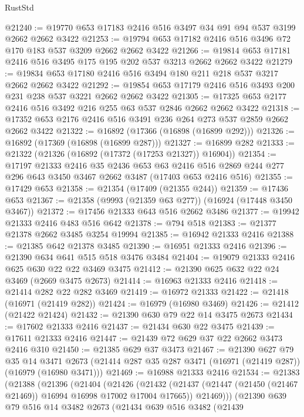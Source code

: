 \begin{lexlean}{RustStd}
\begin{coremodule}
@21240 := @19770 @653 @17183 @2416 @516 @3497 @34 @91 @94 @537 @3199 @2662 @2662 @3422
@21253 := @19794 @653 @17182 @2416 @516 @3496 @72 @170 @183 @537 @3209 @2662 @2662 @3422
@21266 := @19814 @653 @17181 @2416 @516 @3495 @175 @195 @202 @537 @3213 @2662 @2662 @3422
@21279 := @19834 @653 @17180 @2416 @516 @3494 @180 @211 @218 @537 @3217 @2662 @2662 @3422
@21292 := @19854 @653 @17179 @2416 @516 @3493 @200 @231 @238 @537 @3221 @2662 @2662 @3422
@21305 := @17325 @653 @2177 @2416 @516 @3492 @216 @255 @63 @537 @2846 @2662 @2662 @3422
@21318 := @17352 @653 @2176 @2416 @516 @3491 @236 @264 @273 @537 @2859 @2662 @2662 @3422
@21322 := @16892 (@17366 (@16898 (@16899 @292)))
@21326 := @16892 (@17369 (@16898 (@16899 @287)))
@21327 := @16899 @282
@21333 := @21322 (@21326 (@16892 (@17372 (@17253 @21327)) @16904))
@21354 := @17197
    @21333
    @2416
    @35
    @2436
    @653
    @63
    @2416
    @516
    @2869
    @244
    @277
    @296
    @643
    @3450
    @3467
    @2662
    @3487
    (@17403 @653 @2416 @516)
@21355 := @17429 @653
@21358 := @21354 (@17409 (@21355 @244))
@21359 := @17436 @653
@21367 := @21358 (@9993 (@21359 @63 @277)) (@16924 (@17448 @3450 @3467))
@21372 := @17456 @21333 @643 @516 @2662 @3486
@21377 := @19942 @21333 @2416 @483 @516 @642
@21378 := @794 @518
@21383 := @21377 @21378 @2662 @3485 @3254 @19994
@21385 := @16942 @21333 @2416
@21388 := @21385 @642 @21378 @3485
@21390 := @16951 @21333 @2416
@21396 := @21390 @634 @641 @515 @518 @3476 @3484
@21404 := @19079 @21333 @2416 @625 @630 @22 @22 @3469 @3475
@21412 := @21390 @625 @632 @22 @24 @3469 (@2669 @3475 @2673)
@21414 := @16963 @21333 @2416
@21418 := @21414 @282 @22 @282 @3469
@21419 := @16972 @21333
@21422 := @21418 (@16971 (@21419 @282))
@21424 := @16979 (@16980 @3469)
@21426 := @21412 (@21422 @21424)
@21432 := @21390 @630 @79 @22 @14 @3475 @2673
@21434 := @17602 @21333 @2416
@21437 := @21434 @630 @22 @3475
@21439 := @17611 @21333 @2416
@21447 := @21439 @72 @629 @37 @22 @2662 @3473 @2416 @310
@21450 := @21385 @629 @37 @3473
@21467 := @21390
    @627
    @79
    @35
    @14
    @3471
    @2673
    (@21414 @287 @35 @287 @3471 (@16971 (@21419 @287)) (@16979 (@16980 @3471)))
@21469 := @16988 @21333 @2416
@21534 := @21383
    (@21388
      (@21396
        (@21404
          (@21426
            (@21432
              (@21437 (@21447 (@21450 (@21467 @21469)) @16994 @16998 @17002 @17004 @17665))
              @21469)))
        (@21390
          @639
          @79
          @516
          @14
          @3482
          @2673
          (@21434
            @639
            @516
            @3482
            (@21439

\end{coremodule}
\end{lexlean}
